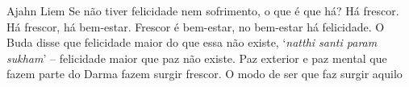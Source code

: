 
\cleartoverso

\begin{quotepage}{0.6}{Ajahn Liem}
Se não tiver felicidade nem sofrimento, o que é que há? Há frescor. Há
frescor, há bem-estar. Frescor é bem-estar, no bem-estar há felicidade.
O Buda disse que felicidade maior do que essa não existe,
‘\textit{natthi santi param sukham}’ – felicidade maior que
paz não existe. Paz exterior e paz mental que fazem parte do Darma
fazem surgir frescor. O modo de ser que faz surgir aquilo 
\end{quotepage}

